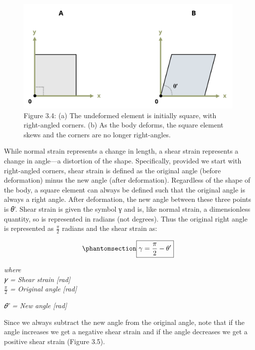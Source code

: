\documentclass[
  letterpaper,
  DIV=11,
  numbers=noendperiod]{scrreprt}
\theoremstyle{definition}
\theoremstyle{remark}
\begin{document}
\begin{figure}[H]

{\centering \includegraphics{images/CH3 PNGs/figure 3.4.png}

}

\caption{Figure 3.4: (a) The undeformed element is initially square,
with right-angled corners. (b) As the body deforms, the square element
skews and the corners are no longer right-angles.}

\end{figure}%

While normal strain represents a change in length, a shear strain
represents a change in angle---a distortion of the shape. Specifically,
provided we start with right-angled corners, shear strain is defined as
the original angle (before deformation) minus the new angle (after
deformation). Regardless of the shape of the body, a square element can
always be defined such that the original angle is always a right angle.
After deformation, the new angle between these three points is 𝜃'. Shear
strain is given the symbol γ and is, like normal strain, a dimensionless
quantity, so is represented in radians (not degrees). Thus the original
right angle is represented as \(\frac{\pi}{2}\) radians and the shear
strain as:

\begin{equation}\phantomsection\label{eq-3.2}{
\boxed{\gamma=\frac{\pi}{2}-\theta^{\prime}}
}\end{equation}

\emph{where}\\
\emph{𝛾 = Shear strain {[}rad{]}}\\
\(\frac{\pi}{2}\) \emph{= Original angle {[}rad{]}}

\emph{𝜃' = New angle {[}rad{]}}

Since we always subtract the new angle from the original angle, note
that if the angle increases we get a negative shear strain and if the
angle decreases we get a positive shear strain (Figure 3.5).
\end{document}

